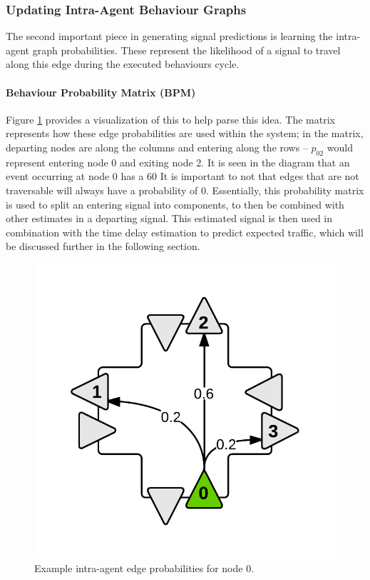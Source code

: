 \documentclass{report}
\begin{document}
\subsubsection{Updating Intra-Agent Behaviour Graphs}
The second important piece in generating signal predictions is learning the intra-agent graph probabilities. 
These represent the likelihood of a signal to travel along this edge during the executed behaviours cycle.

\paragraph{Behaviour Probability Matrix (BPM)}
Figure \ref{fig:BPM-example} provides a visualization of this to help parse this idea. 
The matrix represents how these edge probabilities are used within the system; in the matrix, departing nodes are along the columns and entering along the rows -- $p_{02}$ would represent entering node 0 and exiting node 2. 
It is seen in the diagram that an event occurring at node 0 has a 60%
 It is important to not that edges that are not traversable will always have a probability of 0. 
Essentially, this probability matrix is used to split an entering signal into components, to then be combined with other estimates in a departing signal. 
This estimated signal is then used in combination with the time delay estimation to predict expected traffic, which will be discussed further in the following section.

\begin{figure}[htbp!]
  \begin{centering}
    \includegraphics[scale=0.3]{figures/BPM-example.png}
    \caption{Example intra-agent edge probabilities for node 0.}
    \label{fig:BPM-example}
  \end{centering}
\end{figure}
\end{document}

